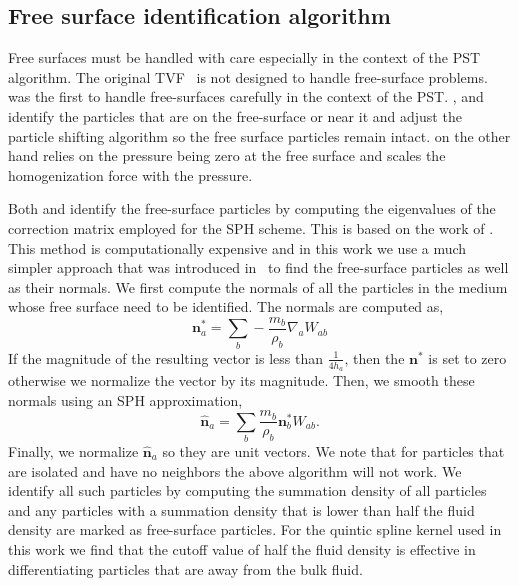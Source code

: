 \documentclass[preprint,12pt]{elsarticle}
\newcommand{\ten}[1]{\ensuremath{\mathbf{#1}}}
\begin{document}
\subsection{Free surface identification algorithm}
\label{subsec:free-surface}

Free surfaces must be handled with care especially in the context of the PST
algorithm. The original TVF~\cite{Adami2013} is not designed to handle
free-surface problems. \citet{diff_smoothing_sph:lind:jcp:2012} was the first
to handle free-surfaces carefully in the context of the PST.
\citet{diff_smoothing_sph:lind:jcp:2012,oger_ale_sph_2016}, and
\citet{sun_consistent_2019} identify the particles that are on the
free-surface or near it and adjust the particle shifting algorithm so the free
surface particles remain intact. \citet{zhang_hu_adams17} on the other hand
relies on the pressure being zero at the free surface and scales the
homogenization force with the pressure.

Both \cite{oger_ale_sph_2016} and \cite{sun_consistent_2019} identify the
free-surface particles by computing the eigenvalues of the correction matrix
employed for the SPH scheme. This is based on the work of
\cite{marrone:sph:level-set:2010}. This method is computationally expensive
and in this work we use a much simpler approach that was introduced
in~\cite{muta_efficient_2020} to find the free-surface particles as well as
their normals. We first compute the normals of all the particles in the medium
whose free surface need to be identified. The normals are computed as,
\begin{equation}
  \label{eq:normal-approx}
  \ten{n}^*_a = \sum_b -\frac{m_b}{\rho_b} \nabla_a W_{ab}
\end{equation}
%
If the magnitude of the resulting vector is less than $\frac{1}{4h_a}$, then
the $\ten{n}^*$ is set to zero otherwise we normalize the vector by its
magnitude. Then, we smooth these normals using an SPH approximation,
\begin{equation}
  \label{eq:normal}
  \hat{\ten{n}}_a = \sum_b \frac{m_b}{\rho_b}\ten{n}^*_b W_{ab}.
\end{equation}
Finally, we normalize $\hat{\ten{n}}_a$ so they are unit vectors. We note that
for particles that are isolated and have no neighbors the above algorithm will
not work. We identify all such particles by computing the summation density of
all particles and any particles with a summation density that is lower than
half the fluid density are marked as free-surface particles. For the quintic
spline kernel used in this work we find that the cutoff value of half the
fluid density is effective in differentiating particles that are away from the
bulk fluid.
\end{document}
